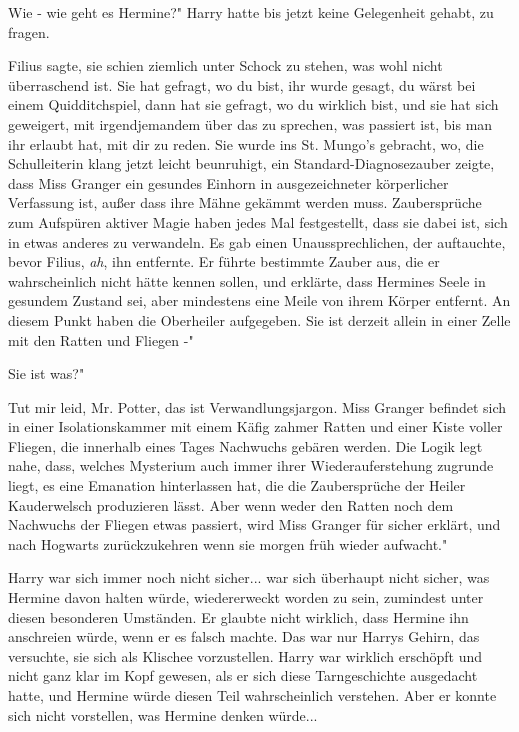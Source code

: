 \glqq{}Wie - wie geht es Hermine?" Harry hatte bis jetzt keine Gelegenheit
gehabt, zu fragen.

\glqq{}Filius sagte, sie schien ziemlich unter Schock zu stehen, was wohl nicht
überraschend ist. Sie hat gefragt, wo du bist, ihr wurde gesagt, du wärst bei
einem Quidditchspiel, dann hat sie gefragt, wo du wirklich bist, und sie hat
sich geweigert, mit irgendjemandem über das zu sprechen, was passiert ist, bis
man ihr erlaubt hat, mit dir zu reden. Sie wurde ins St. Mungo's gebracht,
wo\grqq{}, die Schulleiterin klang jetzt leicht beunruhigt, \glqq{}ein
Standard-Diagnosezauber zeigte, dass Miss Granger ein gesundes Einhorn in
ausgezeichneter körperlicher Verfassung ist, außer dass ihre Mähne gekämmt
werden muss. Zaubersprüche zum Aufspüren aktiver Magie haben jedes Mal
festgestellt, dass sie dabei ist, sich in etwas anderes zu verwandeln. Es gab
einen Unaussprechlichen, der auftauchte, bevor Filius, \emph{ah}, ihn entfernte.
Er führte bestimmte Zauber aus, die er wahrscheinlich nicht hätte kennen sollen,
und erklärte, dass Hermines Seele in gesundem Zustand sei, aber mindestens eine
Meile von ihrem Körper entfernt. An diesem Punkt haben die Oberheiler
aufgegeben. Sie ist derzeit allein in einer Zelle mit den Ratten und Fliegen -"

\glqq{}Sie ist was?"

\glqq{}Tut mir leid, Mr. Potter, das ist Verwandlungsjargon. Miss Granger
befindet sich in einer Isolationskammer mit einem Käfig zahmer Ratten und einer
Kiste voller Fliegen, die innerhalb eines Tages Nachwuchs gebären werden. Die
Logik legt nahe, dass, welches Mysterium auch immer ihrer Wiederauferstehung
zugrunde liegt, es eine Emanation hinterlassen hat, die die Zaubersprüche der
Heiler Kauderwelsch produzieren lässt. Aber wenn weder den Ratten noch dem
Nachwuchs der Fliegen etwas passiert, wird Miss Granger für sicher erklärt, und
nach Hogwarts zurückzukehren wenn sie morgen früh wieder aufwacht."

Harry war sich immer noch nicht sicher... war sich überhaupt nicht sicher, was
Hermine davon halten würde, wiedererweckt worden zu sein, zumindest unter diesen
besonderen Umständen. Er glaubte nicht wirklich, dass Hermine ihn anschreien
würde, wenn er es falsch machte. Das war nur Harrys Gehirn, das versuchte, sie
sich als Klischee vorzustellen. Harry war wirklich erschöpft und nicht ganz klar
im Kopf gewesen, als er sich diese Tarngeschichte ausgedacht hatte, und Hermine
würde diesen Teil wahrscheinlich verstehen. Aber er konnte sich nicht
vorstellen, was Hermine denken würde...

